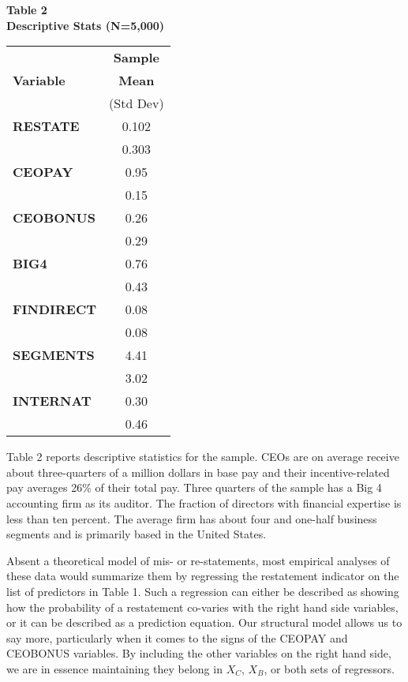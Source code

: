 \documentclass[14pt]{article}
\newcommand\T{\rule[0em]{0pt}{1.5em}}       %
\begin{document}
\begin{table}[t]
\begin{center}
{\bf Table 2} \\
{\bf Descriptive Stats (N=5,000)} \\[1em]
\begin{tabular}{|l|c|}
\hline
             & {\bf Sample }   \\
{\bf Variable}  &   {\bf Mean }   \\ 
          &  (Std Dev)   \\ \hline
\T {\bf RESTATE} &   0.102  \\
                           &   0.303  \\[.6em]
    {\bf CEOPAY} &     0.95  \\
                           &     0.15  \\[.6em]
    {\bf CEOBONUS} &    0.26  \\
                           &     0.29  \\[.6em]
    {\bf BIG4} &   0.76  \\
                           &     0.43  \\[.6em]
    {\bf FINDIRECT} &    0.08  \\
                           &     0.08  \\[.6em]
    {\bf SEGMENTS} &    4.41  \\
                           &    3.02  \\[.6em]
    {\bf INTERNAT} &     0.30  \\
                           &     0.46  \\[.6em]
\hline
\end{tabular}
\end{center}
\end{table}

Table 2 reports descriptive statistics for the sample. CEOs are on average receive about three-quarters
of a million dollars in base pay and their incentive-related pay averages 26\% of their total pay.
Three quarters of the sample has a Big 4 accounting firm as its auditor. The fraction of directors
with financial expertise is less than ten percent. The average firm has about four and one-half
business segments and is primarily based in the United States.

Absent a theoretical model of mis- or re-statements, most empirical
analyses of these data would summarize them by regressing the restatement
indicator on the list of predictors in Table 1. Such a regression can either be described
as showing how the probability of a restatement co-varies with the right hand side variables,
or it can be described as a prediction equation. Our structural model allows us to say more,
particularly when it comes to the signs of the CEOPAY and CEOBONUS variables. By including
the other variables on the right hand side, we are in essence maintaining they belong in
$X_C$, $X_B$, or both sets of regressors.
\end{document}
